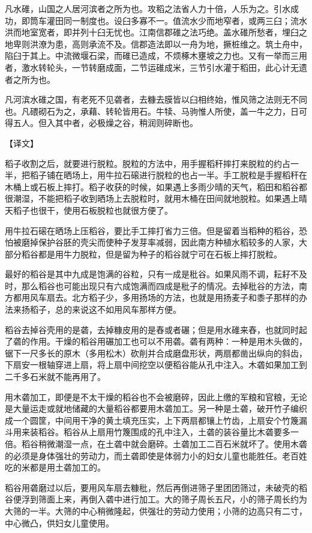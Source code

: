 \documentclass[12pt,UTF8]{ctexbook}
\begin{document}
凡水碓，山国之人居河滨者之所为也。攻稻之法省人力十倍，人乐为之。引水成功，即筒车灌田同一制度也。设臼多寡不一。值流水少而地窄者，或两三臼；流水洪而地室宽者，即并列十臼无忧也。江南信郡碓之法巧绝。盖水碓所愁者，埋臼之地卑则洪潦为患，高则承流不及。信郡造法即以一舟为地，撅桩维之。筑土舟中，陷臼于其上。中流微堰石梁，而碓已造成，不烦椓木壅坡之力也。又有一举而三用者，激水转轮头，一节转磨成面，二节运碓成米，三节引水灌于稻田，此心计无遗者之所为也。

凡河滨水碓之国，有老死不见砻者，去糠去膜皆以臼相终始，惟风筛之法则无不同也。凡碨砌石为之，承藉、转轮皆用石。牛犊、马驹惟人所使，盖一牛之力，日可得五人。但入其中者，必极燥之谷，稍润则碎断也。

【译文】

稻子收割之后，就要进行脱粒。脱粒的方法中，用手握稻秆摔打来脱粒的约占一半，把稻子铺在晒场上，用牛拉石磙进行脱粒的也占一半。手工脱粒是手握稻秆在木桶上或石板上摔打。稻子收获的时候，如果遇上多雨少晴的天气，稻田和稻谷都很潮湿，不能把稻子收到晒场上去脱粒时，就用木桶在田间就地脱粒。如果遇上晴天稻子也很干，使用石板脱粒也就很方便了。

用牛拉石磙在晒场上压稻谷，要比手工摔打省力三倍。但是留着当稻种的稻谷，恐怕被磨掉保护谷胚的壳尖而使种子发芽率减弱，因此南方种植水稻较多的人家，大部分稻谷都是用牛力脱粒，但是留为种子的稻谷就宁可在石板上摔打脱粒。

最好的稻谷是其中九成是饱满的谷粒，只有一成是秕谷。如果风雨不调，耘耔不及时，那么稻谷也可能出现只有六成饱满而四成是秕子的情况。去掉秕谷的方法，南方都用风车扇去。北方稻子少，多用扬场的方法，也就是用扬麦子和黍子那样的办法来扬稻子，总的来说这不如用风车那样方便。

稻谷去掉谷壳用的是砻，去掉糠皮用的是舂或者碾；但是用水碓来舂，也就同时起了砻的作用。干燥的稻谷用碾加工也可以不用砻。砻有两种：一种是用木头做的，锯下一尺多长的原木（多用松木）砍削并合成磨盘形状，两扇都凿出纵向的斜齿，下扇安一根轴穿进上扇，将上扇中间挖空以便稻谷能从孔中注入。木砻如果加工到二千多石米就不能再用了。

用木砻加工，即便是不太干燥的稻谷也不会被磨碎，因此上缴的军粮和官粮，无论是大量运走或就地储藏的大量稻谷都要用木砻加工。另一种是土砻，破开竹子编织成一个圆筐，中间用干净的黄土填充压实，上下两扇都镶上竹齿，上扇安个竹篾漏斗用来装稻谷。稻谷从上扇用竹篾围成的孔中注入，土砻的装谷量比木砻要多一倍。稻谷稍微潮湿一点，在土砻中就会磨碎。土砻加工二百石米就坏了。使用木砻的必须是身体强壮的劳动力，而土砻即使是体弱力小的妇女儿童也能胜任。老百姓吃的米都是用土砻加工的。

稻谷用砻磨过以后，要用风车扇去糠秕，然后再倒进筛子里团团筛过，未破壳的稻谷便浮到筛面上来，再倒入砻中进行加工。大的筛子周长五尺，小的筛子周长约为大筛的一半。大筛的中心稍微隆起，供强壮的劳动力使用；小筛的边高只有二寸，中心微凸，供妇女儿童使用。
\end{document}
